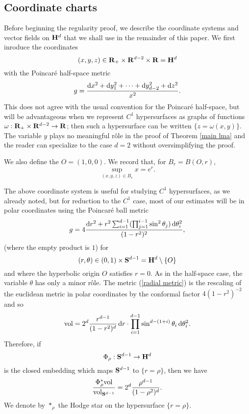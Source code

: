 \subsection{Coordinate charts}
Before beginning the regularity proof, we describe the coordinate systems and vector fields on $\mathbf H^d$ that we shall use in the remainder of this paper. We first inroduce the coordinates
$$(x, y, z) \in \mathbf{R}_+ \times \mathbf{R}^{d - 2} \times \mathbf{R} = \mathbf H^d$$
with the Poincar\'e half-space metric
\begin{equation}\label{hyperbolic metric}
g = \frac{\mathop{}\!\mathrm{d} x^2 + \mathop{}\!\mathrm{d} y_1^2 + \cdots + \mathop{}\!\mathrm{d} y_{d - 2}^2 + \mathop{}\!\mathrm{d} z^2}{x^2}.
\end{equation}
This does not agree with the usual convention for the Poincar\'e half-space, but will be advantageous when we represent $C^1$ hypersurfaces as graphs of functions $\omega: \mathbf{R}_+ \times \mathbf{R}^{d - 2} \to \mathbf{R}$; then such a hypersurface can be written $\{z = \omega(x, y)\}$.
The variable $y$ plays no meaningful r\^ole in the proof of Theorem \ref{main lma} and the reader can specialize to the case $d = 2$ without oversimplifying the proof.

We also define the  $O = (1, 0, 0)$.
We record that, for $B_r = B(O, r)$,
\begin{equation}\label{sup in a ball}
\sup_{(x, y, z) \in B_r} x = e^r.
\end{equation}

The above coordinate system is useful for studying $C^1$ hypersurfaces, as we already noted, but for reduction to the $C^1$ case, most of our estimates will be in polar coordinates using the Poincar\'e ball metric
\begin{equation}\label{radial metric}
g = 4\frac{\mathop{}\!\mathrm{d} r^2 + r^2 \sum_{i=1}^{d-1} (\prod_{j=1}^{i-1} \sin^2 \theta_j) \mathop{}\!\mathrm{d}\theta_i^2}{(1 - r^2)^2},
\end{equation}
(where the empty product is $1$)
for
$$(r, \theta) \in (0, 1) \times \mathbf S^{d - 1} = \mathbf H^d \setminus \{O\}$$
and where the hyperbolic origin $O$ satisfies $r = 0$.
As in the half-space case, the variable $\theta$ has only a minor r\^ole.
The metric (\ref{radial metric}) is the rescaling of the euclidean metric in polar coordinates by the conformal factor $4(1 - r^2)^{-2}$ and so
\begin{equation}\label{volume in polar coordinates}
\mathrm{vol} = 2^d \frac{r^{d - 1}}{(1 - r^2)^d} \mathop{}\!\mathrm{d} r \cdot \prod_{i=1}^{d - 1} \sin^{d - (1 + i)} \theta_i \mathop{}\!\mathrm{d} \theta_i^2.
\end{equation}
Therefore, if 
$$\Phi_\rho: \mathbf S^{d - 1} \to \mathbf H^d$$
is the closed embedding which maps $\mathbf S^{d - 1}$ to $\{r = \rho\}$, then we have 
\begin{equation}\label{volume of a sphere in polar coordinates}
\frac{\Phi_\rho^* \mathrm{vol}}{\mathrm{vol}_{\mathbf S^{d - 1}}} = 2^d \frac{\rho^{d - 1}}{(1 - \rho^2)^d}.
\end{equation}
We denote by $*_\rho$ the Hodge star on the hypersurface $\{r = \rho\}$.
